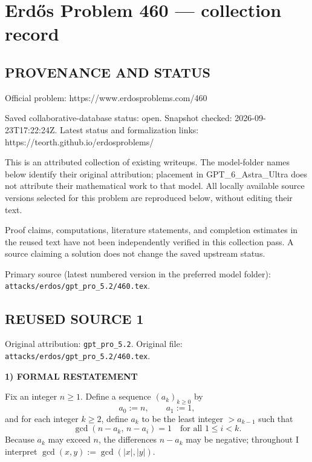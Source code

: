 \section*{Erd\H{o}s Problem 460 --- collection record}

\subsection*{PROVENANCE AND STATUS}
Official problem: https://www.erdosproblems.com/460

Saved collaborative-database status: open.
Snapshot checked: 2026-09-23T17:22:24Z.
Latest status and formalization links: https://teorth.github.io/erdosproblems/

This is an attributed collection of existing writeups. The model-folder names below identify their original attribution; placement in GPT\_6\_Astra\_Ultra does not attribute their mathematical work to that model. All locally available source versions selected for this problem are reproduced below, without editing their text.

Proof claims, computations, literature statements, and completion estimates in the reused text have not been independently verified in this collection pass. A source claiming a solution does not change the saved upstream status.

Primary source (latest numbered version in the preferred model folder): \texttt{attacks/erdos/gpt\_pro\_5.2/460.tex}.

\subsection*{REUSED SOURCE 1}
Original attribution: \texttt{gpt\_pro\_5.2}.
Original file: \texttt{attacks/erdos/gpt\_pro\_5.2/460.tex}.


\noindent\textbf{1) FORMAL RESTATEMENT}

Fix an integer $n\ge 1$. Define a sequence $(a_k)_{k\ge 0}$ by
\[a_0:=n,\qquad a_1:=1,\]
and for each integer $k\ge 2$, define $a_k$ to be the least integer $>a_{k-1}$ such that
\[\gcd(n-a_k,\,n-a_i)=1\quad\text{for all }1\le i<k.
\]
Because $a_k$ may exceed $n$, the differences $n-a_k$ may be negative; throughout I interpret $\gcd(x,y):=\gcd(|x|,|y|)$.

